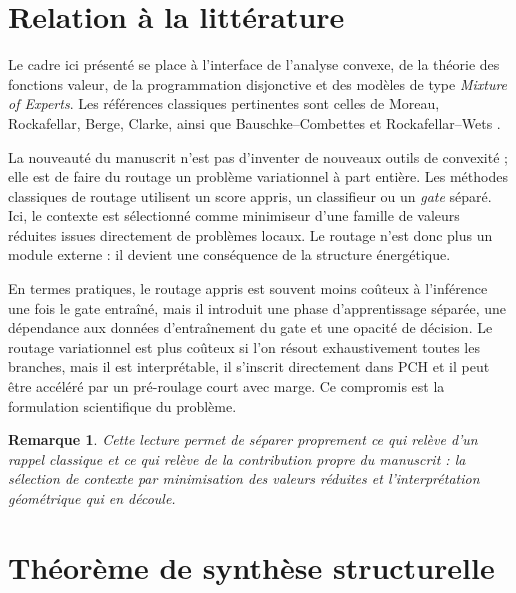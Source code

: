 \documentclass[11pt,a4paper]{article}
\newtheorem{remark}{Remarque}[section]
\begin{document}
\section{Relation à la littérature}

Le cadre ici présenté se place à l'interface de l'analyse convexe, de la théorie des fonctions valeur, de la programmation disjonctive et des modèles de type \emph{Mixture of Experts}. Les références classiques pertinentes sont celles de Moreau, Rockafellar, Berge, Clarke, ainsi que Bauschke--Combettes et Rockafellar--Wets \cite{Moreau1965,Rockafellar1970,Berge1963,Clarke1983,BauschkeCombettes2017,RockafellarWets1998}.

La nouveauté du manuscrit n'est pas d'inventer de nouveaux outils de convexité ; elle est de faire du routage un problème variationnel à part entière. Les méthodes classiques de routage utilisent un score appris, un classifieur ou un \emph{gate} séparé. Ici, le contexte est sélectionné comme minimiseur d'une famille de valeurs réduites issues directement de problèmes locaux. Le routage n'est donc plus un module externe : il devient une conséquence de la structure énergétique.

En termes pratiques, le routage appris est souvent moins coûteux à l'inférence une fois le gate entraîné, mais il introduit une phase d'apprentissage séparée, une dépendance aux données d'entraînement du gate et une opacité de décision. Le routage variationnel est plus coûteux si l'on résout exhaustivement toutes les branches, mais il est interprétable, il s'inscrit directement dans PCH et il peut être accéléré par un pré-roulage court avec marge. Ce compromis est la formulation scientifique du problème.

\begin{remark}
Cette lecture permet de séparer proprement ce qui relève d'un rappel classique et ce qui relève de la contribution propre du manuscrit : la sélection de contexte par minimisation des valeurs réduites et l'interprétation géométrique qui en découle.
\end{remark}

\section{Théorème de synthèse structurelle}
\end{document}
